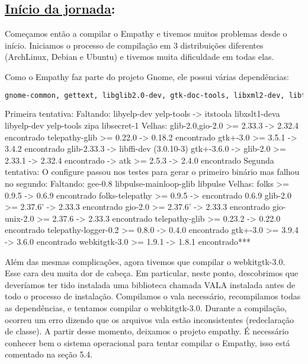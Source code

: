 \subsection*{\underline{Início da jornada}:}
Começamos então a compilar o Empathy e tivemos muitos problemas desde o início.
Iniciamos o processo de compilação em 3 distribuições diferentes (ArchLinux,
Debian e Ubuntu) e tivemos muita dificuldade em todas elas.

Como o Empathy faz parte do projeto Gnome, ele possui várias dependências:

\begin{lstlisting}[language=bash]
	gnome-common, gettext, libglib2.0-dev, gtk-doc-tools, libxml2-dev, libtelepathy-glib-dev, libmissioncontrol-client-dev, libtelepathy-farsight-dev, libx11-dev, libgtk2.0-dev, libice-dev{a}, libcanberra-gtk-dev, libgstreamer-plugins-base0.10-dev, libebook1.2-dev, libnotify-dev, libunique-dev, libgnome-keyring-dev, libtelepathy-logger-dev, libwebkitgtk-3.0-dev, libgnutls-dev, libfolks-telepathy-dev, libcanberra-gtk3-dev, libgcr-3-dev, gsettings-desktop-schemas-dev
\end{lstlisting}

Primeira tentativa:
Faltando:
  libyelp-dev yelp-tools -> itstool{a} libxslt1-dev{a} libyelp-dev yelp-tools zip{a}
  libsecret-1
    Velhas:
  {glib-2.0,gio-2.0} >= 2.33.3  -> 2.32.4 encontrado
  telepathy-glib >= 0.22.0 -> 0.18.2 encontrado
       gtk+-3.0 >= 3.5.1 -> 3.4.2 encontrado
glib-2.33.3 -> libffi-dev (3.0.10-3)
gtk+-3.6.0 -> glib-2.0 >= 2.33.1 -> 2.32.4 encontrado
       -> atk >= 2.5.3 -> 2.4.0 encontrado
Segunda tentativa:
O configure passou nos testes para   gerar o primeiro binário mas falhou no segundo:
    Faltando:
gee-0.8
libpulse-mainloop-glib
libpulse
Velhas:
folks >= 0.9.5 -> 0.6.9 encontrado
folks-telepathy >= 0.9.5 -> encontrado 0.6.9
glib-2.0 >= 2.37.6' -> 2.33.3 encontrado
gio-2.0 >= 2.37.6' -> 2.33.3 encontrado
gio-unix-2.0 >= 2.37.6 -> 2.33.3 encontrado
telepathy-glib >= 0.23.2 -> 0.22.0 encontrado
telepathy-logger-0.2 >= 0.8.0 -> 0.4.0 encontrado
gtk+-3.0 >= 3.9.4 -> 3.6.0 encontrado
webkitgtk-3.0 >= 1.9.1 -> 1.8.1 encontrado***

Além das mesmas complicações, agora tivemos que compilar o webkitgtk-3.0.
Esse cara deu muita dor de cabeça. Em particular, neste ponto, descobrimos que deveríamos ter tido instalada uma biblioteca chamada VALA instalada antes de todo o processo de instalação.
Compilamos o vala necessário, recompilamos todas as dependências, e tentamos compilar o webkitgtk-3.0. Durante a compilação, ocorreu um erro dizendo que os arquivos vala estão inconsistentes (redeclaração de classe). A partir desse momento, deixamos o projeto empathy.
É necessário conhecer bem o sistema operacional para tentar compilar o Empathy, isso está comentado na seção 5.4.


